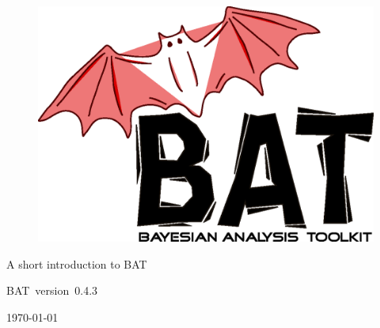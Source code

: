 \documentclass[11pt, a4paper]{article}
\newcommand{\bat}{{\sc BAT}}
\newcommand{\versionno}{0.4.3}
\newcommand{\version}{version~\versionno}
\begin{document}

\thispagestyle{empty}

\begin{figure}
\includegraphics[scale=0.25]{bat.eps}
\end{figure}

\vspace*{1cm}

\begin{center}


{\Large A short introduction to \bat}
\\

\vspace{1cm}

{\large \bat\ \version}

\end{center}

\thispagestyle{empty}

\vfill

\begin{center}
\today
\end{center}

\pagebreak


\thispagestyle{empty}

\enlargethispage{2cm}

\tableofcontents

\pagebreak

\end{document}

